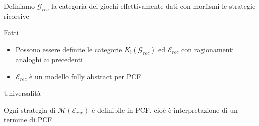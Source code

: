 \documentclass{beamer}
\begin{document}
\begin{frame}
	
	Definiamo $\mathcal{G}_{rec}$ la categoria dei giochi effettivamente dati con morfismi le strategie ricorsive
	
	\begin{block}{Fatti}
		
		\begin{itemize}
			\item Possono essere definite le categorie $K_!(\mathcal{G}_{rec})$ ed $\mathcal{E}_{rec}$ con ragionamenti analoghi ai precedenti
			\item $\mathcal{E}_{rec}$ è un modello fully abstract per PCF
		\end{itemize}
		
	\end{block}
	
	
	\begin{block}{Universalità}
		
		Ogni strategia di $\mathcal{M}(\mathcal{E}_{rec})$ è definibile in PCF, cioè
		è interpretazione di un termine di PCF
		
	\end{block}

\end{frame}
\end{document}
